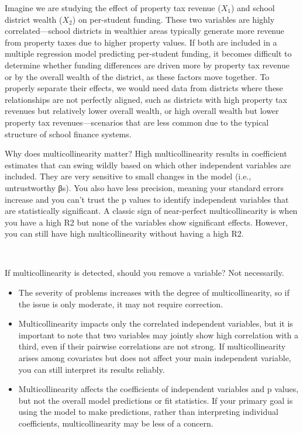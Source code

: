 \documentclass[
  letterpaper,
  DIV=11,
  numbers=noendperiod]{scrreprt}
\begin{document}
Imagine we are studying the effect of property tax revenue (\(X_1\)) and
school district wealth (\(X_2\)) on per-student funding. These two
variables are highly correlated---school districts in wealthier areas
typically generate more revenue from property taxes due to higher
property values. If both are included in a multiple regression model
predicting per-student funding, it becomes difficult to determine
whether funding differences are driven more by property tax revenue or
by the overall wealth of the district, as these factors move together.
To properly separate their effects, we would need data from districts
where these relationships are not perfectly aligned, such as districts
with high property tax revenues but relatively lower overall wealth, or
high overall wealth but lower property tax revenues---scenarios that are
less common due to the typical structure of school finance systems.

Why does multicollinearity matter? High multicollinearity results in
coefficient estimates that can swing wildly based on which other
independent variables are included. They are very sensitive to small
changes in the model (i.e., untrustworthy βs). You also have less
precision, meaning your standard errors increase and you can't trust the
p values to identify independent variables that are statistically
significant. A classic sign of near-perfect multicollinearity is when
you have a high R2 but none of the variables show significant effects.
However, you can still have high multicollinearity without having a high
R2.\,

\,

If multicollinearity is detected, should you remove a variable? Not
necessarily.

\begin{itemize}
\item
  The severity of problems increases with the degree of
  multicollinearity, so if the issue is only moderate, it may not
  require correction.\,\,
\item
  Multicollinearity impacts only the correlated independent variables,
  but it is important to note that two variables may jointly show high
  correlation with a third, even if their pairwise correlations are not
  strong. If multicollinearity arises among covariates but does not
  affect your main independent variable, you can still interpret its
  results reliably.
\item
  Multicollinearity affects the coefficients of independent variables
  and p values, but not the overall model predictions or fit statistics.
  If your primary goal is using the model to make predictions, rather
  than interpreting individual coefficients, multicollinearity may be
  less of a concern.\,\,
\end{itemize}
\end{document}
